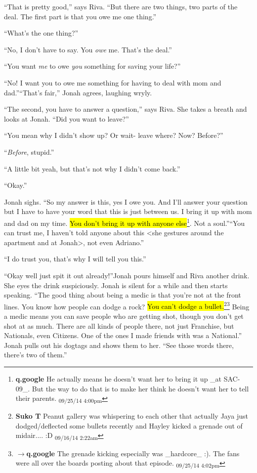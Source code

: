 ``That is pretty good,'' says Riva.  ``But there are two things, two parts of the deal.  The first part is that you owe me one thing.''

``What's the one thing?''

``No, I don't have to say.  You \textit{owe} me.  That's the deal.''

``You want \textit{me} to owe \textit{you} something for saving your life?''

``No!  I want you to owe me something for having to deal with mom and dad.''``That's fair,'' Jonah agrees, laughing wryly.

``The second, you have to answer a question,'' says Riva.  She takes a breath and looks at Jonah.  ``Did you want to leave?''

``You mean why I didn't show up?  Or wait- leave where? Now?  Before?''

``\textit{Before}, stupid.''

``A little bit yeah, but that's not why I didn't come back.''

``Okay.''

Jonah sighs.  ``So my answer is this, yes I owe you.  And I'll answer your question but I have to have your word that this is just between us.  I bring it up with mom and dad on my time.  \hl{You don't bring it up with anyone else}\footnote{\textbf{q.google }He actually means he doesn't want her to bring it up \_at SAC-09\_.  But the way to do that is to make her think he doesn't want her to tell their parents. \textsubscript{09/25/14 4:00pm}}.  Not a soul.''``You can trust me, I haven't told anyone about this \textless she gestures around the apartment and at Jonah\textgreater , not even Adriano.''

``I do trust you, that's why I will tell you this.''

``Okay well just spit it out already!''Jonah pours himself and Riva another drink.  She eyes the drink suspiciously.  Jonah is silent for a while and then starts speaking.  ``The good thing about being a medic is that you're not at the front lines.  You know how people can dodge a rock?  \hl{You can't dodge a bullet.}\footnote{\textbf{Suko T }Peanut gallery was whispering to each other that actually Jaya just dodged/deflected some bullets recently and Hayley kicked a grenade out of midair.... :D \textsubscript{09/16/14 2:22am}}\footnote{$\rightarrow$\textbf{q.google }The grenade kicking especially was \_hardcore\_ :).  The fans were all over the boards posting about that episode. \textsubscript{09/25/14 4:02pm}}  Being a medic means you can save people who are getting shot, though you don't get shot at as much.  There are all kinds of people there, not just Franchise, but Nationals, even Citizens.  One of the ones I made friends with was a National.''  Jonah pulls out his dogtags and shows them to her.  ``See those words there, there's two of them.''

